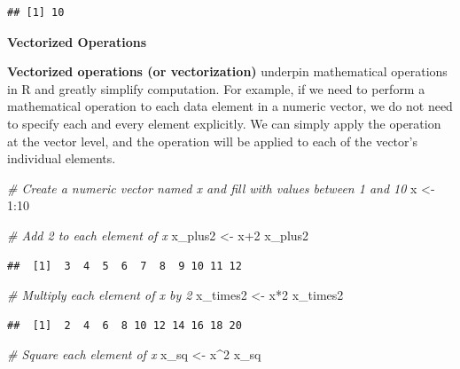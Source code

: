 \documentclass[
]{book}
\newenvironment{Shaded}{\begin{snugshade}}{\end{snugshade}}
\newcommand{\CommentTok}[1]{\textcolor[rgb]{0.56,0.35,0.01}{\textit{#1}}}
\newcommand{\DecValTok}[1]{\textcolor[rgb]{0.00,0.00,0.81}{#1}}
\newcommand{\NormalTok}[1]{#1}
\newcommand{\OtherTok}[1]{\textcolor[rgb]{0.56,0.35,0.01}{#1}}
\newcommand{\SpecialCharTok}[1]{\textcolor[rgb]{0.00,0.00,0.00}{#1}}
\begin{document}
\begin{verbatim}
## [1] 10
\end{verbatim}

\textbf{Vectorized Operations}

\textbf{Vectorized operations (or vectorization)} underpin mathematical operations in R and greatly simplify computation. For example, if we need to perform a mathematical operation to each data element in a numeric vector, we do not need to specify each and every element explicitly. We can simply apply the operation at the vector level, and the operation will be applied to each of the vector's individual elements.

\begin{Shaded}
\begin{Highlighting}[]
\CommentTok{\# Create a numeric vector named x and fill with values between 1 and 10}
\NormalTok{x }\OtherTok{\textless{}{-}} \DecValTok{1}\SpecialCharTok{:}\DecValTok{10}
\end{Highlighting}
\end{Shaded}

\begin{Shaded}
\begin{Highlighting}[]
\CommentTok{\# Add 2 to each element of x}
\NormalTok{x\_plus2 }\OtherTok{\textless{}{-}}\NormalTok{ x}\SpecialCharTok{+}\DecValTok{2}
\NormalTok{x\_plus2}
\end{Highlighting}
\end{Shaded}

\begin{verbatim}
##  [1]  3  4  5  6  7  8  9 10 11 12
\end{verbatim}

\begin{Shaded}
\begin{Highlighting}[]
\CommentTok{\# Multiply each element of x by 2}
\NormalTok{x\_times2 }\OtherTok{\textless{}{-}}\NormalTok{ x}\SpecialCharTok{*}\DecValTok{2}
\NormalTok{x\_times2}
\end{Highlighting}
\end{Shaded}

\begin{verbatim}
##  [1]  2  4  6  8 10 12 14 16 18 20
\end{verbatim}

\begin{Shaded}
\begin{Highlighting}[]
\CommentTok{\# Square each element of x}
\NormalTok{x\_sq }\OtherTok{\textless{}{-}}\NormalTok{ x}\SpecialCharTok{\^{}}\DecValTok{2}
\NormalTok{x\_sq}
\end{Highlighting}
\end{Shaded}
\end{document}
